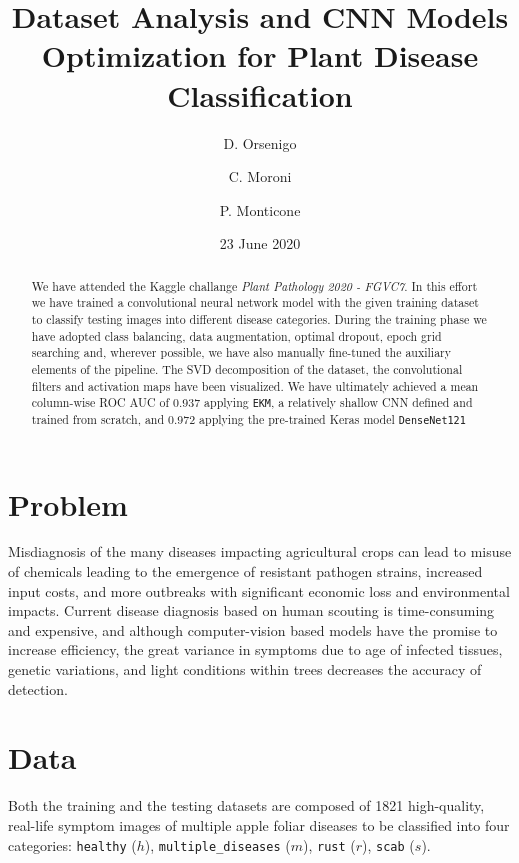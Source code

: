 \documentclass[aps,twocolumn,secnumarabic,nobalancelastpage,amsmath,amssymb,
nofootinbib]{revtex4}
\begin{document}
\title{Dataset Analysis and CNN Models Optimization for Plant Disease
	Classification}
\author {D. Orsenigo}
\author {C. Moroni}
\author {P. Monticone}

\date{23 June 2020}
\begin{abstract}
	We have attended the Kaggle challange \emph{Plant Pathology 2020 -
		FGVC7}. In this effort we have trained a convolutional neural network
	model with the given training dataset to classify testing images into
	different disease categories. During the training phase we have adopted
	class balancing, data augmentation, optimal dropout, epoch grid
	searching and, wherever possible, we have also manually fine-tuned the
	auxiliary elements of the pipeline. The SVD decomposition of the
	dataset, the convolutional filters and activation maps have been
	visualized. We have ultimately achieved a mean column-wise ROC AUC of
	0.937 applying \texttt{EKM}, a relatively shallow CNN defined and
	trained from scratch, and 0.972 applying the pre-trained Keras model
	\texttt{DenseNet121}\\
\end{abstract}
\maketitle
\tableofcontents


\section{Problem}
Misdiagnosis of the many diseases impacting agricultural crops can lead to misuse of chemicals leading to the emergence of resistant pathogen strains, increased input costs, and more outbreaks with significant economic loss and environmental impacts. Current disease diagnosis based on human scouting is time-consuming and expensive, and although computer-vision based models have the promise to increase efficiency, the great variance in symptoms due to age of infected tissues, genetic variations, and light conditions within trees decreases the accuracy of detection.

\section{Data}
Both the training and the testing datasets are composed of 1821
high-quality, real-life symptom images of multiple apple foliar diseases
to be classified into four categories: \texttt{healthy} (\(h\)),
\texttt{multiple\_diseases} (\(m\)), \texttt{rust} (\(r\)),
\texttt{scab} (\(s\)).
\end{document}
